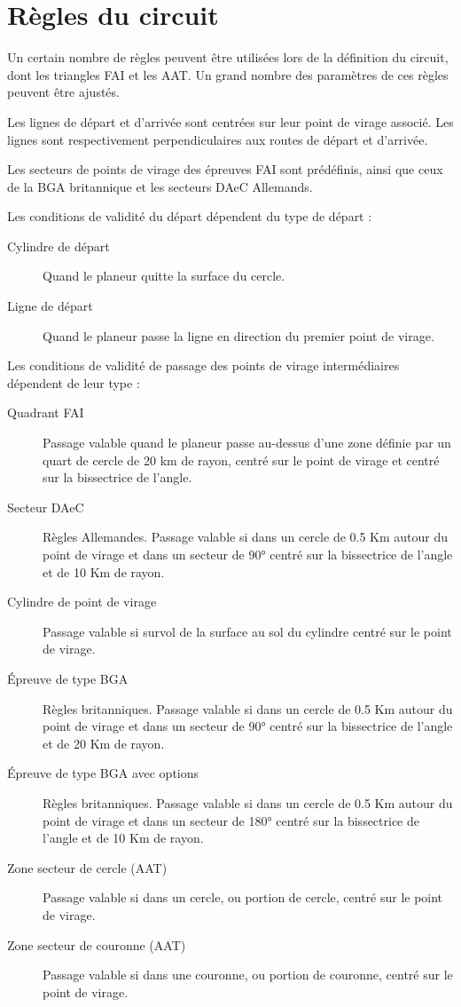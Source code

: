 \section{Règles du circuit}\label{sec:task-rules}

Un certain nombre de règles peuvent être utilisées lors de la définition du circuit, dont les triangles FAI et les AAT. Un grand nombre des paramètres de ces règles peuvent être ajustés.

Les lignes de départ et d'arrivée sont centrées sur leur point de virage associé. Les lignes sont respectivement perpendiculaires aux routes de départ et d'arrivée.

Les secteurs de points de virage des épreuves FAI sont prédéfinis, ainsi que ceux de la BGA britannique et les secteurs DAeC Allemands.

Les conditions de validité du départ dépendent du type de départ :
\begin{description}
\item[Cylindre de départ] Quand le planeur quitte la surface du cercle.
\item[Ligne de départ] Quand le planeur passe la ligne en direction du premier point de virage.
\end{description}

Les conditions de validité de passage des points de virage intermédiaires dépendent de leur type :
\begin{description}
\item[Quadrant FAI] Passage valable quand le planeur passe au-dessus d'une zone définie par un quart de cercle de 20 km de rayon, centré sur le point de virage et centré sur la bissectrice de l'angle.
\item[Secteur DAeC] Règles Allemandes. Passage valable si dans un cercle de 0.5 Km autour du point de virage et dans un secteur de 90° centré sur la bissectrice de l'angle et de 10 Km de rayon.
\item[Cylindre de point de virage]  Passage valable si survol de la surface au sol du cylindre centré sur le point de virage.
\item[Épreuve de type BGA]  Règles britanniques. Passage valable si dans un cercle de 0.5 Km autour du point de virage et dans un secteur de 90° centré sur la bissectrice de l'angle et de 20 Km de rayon.
\item[Épreuve de type BGA avec options] Règles britanniques. Passage valable si dans un cercle de 0.5 Km autour du point de virage et dans un secteur de 180° centré sur la bissectrice de l'angle et de 10 Km de rayon.
\item[Zone secteur de cercle (AAT)]  Passage valable si dans un cercle, ou portion de cercle, centré sur le point de virage. 
\item[Zone secteur de couronne (AAT)]  Passage valable si dans une couronne, ou portion de couronne, centré sur le point de virage. 
\end{description}

